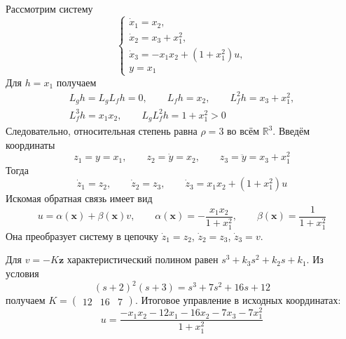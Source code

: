 Рассмотрим систему
\begin{equation}
  \begin{cases}
    \dot x_1=x_2,\\
    \dot x_2=x_3+x_1^2,\\
    \dot x_3=-x_1x_2+(1+x_1^2)u,\\
    y=x_1
  \end{cases}
\end{equation}
Для $h=x_1$ получаем
\begin{equation}
  \begin{gathered}
    L_gh=L_gL_fh=0,\qquad
    L_fh=x_2,\qquad L_f^2h=x_3+x_1^2,\\
    L_f^3h=x_1x_2,\qquad L_gL_f^2h=1+x_1^2>0
  \end{gathered}
\end{equation}
Следовательно, относительная степень равна $\rho=3$ во всём
$\mathbb R^3$. Введём координаты
\begin{equation}
  z_1=y=x_1,\qquad z_2=\dot y=x_2,\qquad
  z_3=\ddot y=x_3+x_1^2
\end{equation}
Тогда
\begin{equation}
  \dot z_1=z_2,\qquad \dot z_2=z_3,\qquad
  \dot z_3=x_1x_2+(1+x_1^2)u
\end{equation}
Искомая обратная связь имеет вид
\begin{equation}
  u=\alpha(\bm x)+\beta(\bm x)v,\qquad
  \alpha(\bm x)=-\frac{x_1x_2}{1+x_1^2},\qquad
  \beta(\bm x)=\frac{1}{1+x_1^2}
\end{equation}
Она преобразует систему в цепочку
$\dot z_1=z_2$, $\dot z_2=z_3$, $\dot z_3=v$.

Для $v=-K\bm z$ характеристический полином равен
$s^3+k_3s^2+k_2s+k_1$. Из условия
\begin{equation}
  (s+2)^2(s+3)=s^3+7s^2+16s+12
\end{equation}
получаем $K=\begin{pmatrix}12&16&7\end{pmatrix}$.
Итоговое управление в исходных координатах:
\begin{equation}
  u=\frac{-x_1x_2-12x_1-16x_2-7x_3-7x_1^2}{1+x_1^2}
\end{equation}

